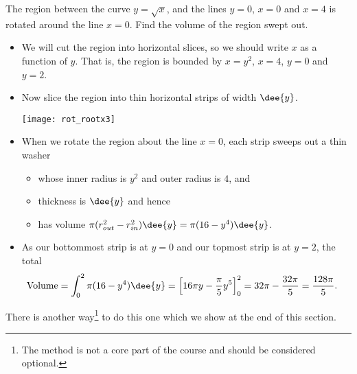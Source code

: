 \begin{eg}\label{eg rot yaxis}
The region between the curve $y=\sqrt{x}$, and the lines $y=0$, $x=0$ and $x=4$
is rotated around the line $x=0$. Find the volume of the region swept out.

\soln
\begin{itemize}
 \item We will cut the region into horizontal slices, so we should write $x$ as a
function of $y$. That is, the region is bounded by $x=y^2$, $x=4$, $y=0$ and $y=2$.
 \item Now slice the region into thin horizontal strips of width $\dee{y}$.
\begin{wfig}
 \centering
\texttt{[image: rot\_rootx3]}
\end{wfig}

\item When we rotate the region about the line $x=0$, each strip sweeps out a thin
washer
\begin{itemize}
\item whose inner radius is $y^2$ and outer radius is $4$, and
\item thickness is $\dee{y}$ and hence
\item has volume $\pi(r_{out}^2 - r_{in}^2)\dee{y} = \pi(16-y^4)\dee{y}$.
\end{itemize}
\item As our bottommost strip is at $y=0$ and our topmost
strip is at $y=2$, the total
\begin{align*}
\text{Volume}
&= \int _0^2 \pi(16-y^4) \dee{y}
=\left[16\pi y - \frac{\pi}{5}y^5 \right]_0^2
= 32\pi - \frac{32\pi}{5} = \frac{128\pi}{5}.
\end{align*}
\end{itemize}
\end{eg}
There is another way\footnote{The method is not a core part of the course and should be
considered optional.} to do this one which we show at the end of this section.


